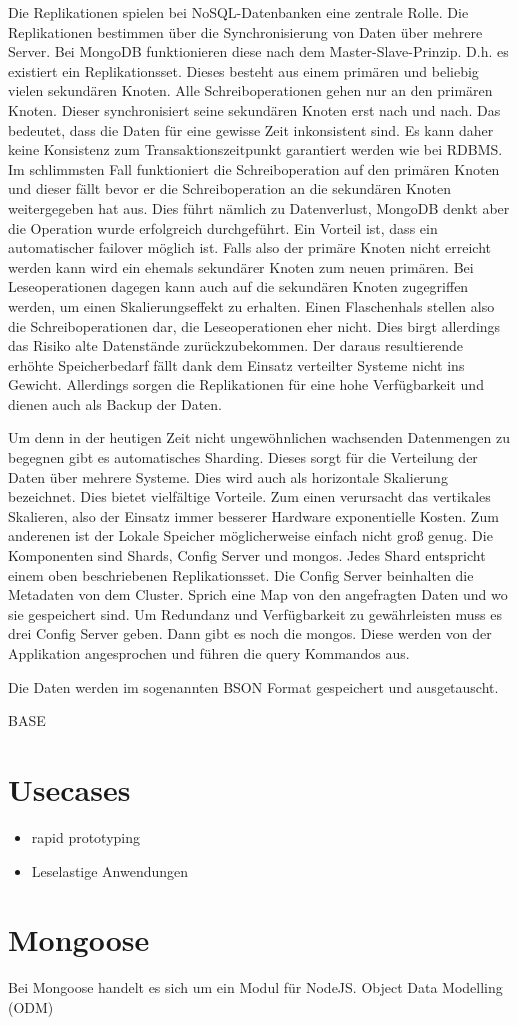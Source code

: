 Die Replikationen spielen bei NoSQL-Datenbanken eine zentrale Rolle. Die
Replikationen bestimmen über die Synchronisierung von Daten über mehrere
Server. Bei MongoDB funktionieren diese nach dem Master-Slave-Prinzip.
D.h. es existiert ein Replikationsset. Dieses besteht aus einem primären
und beliebig vielen sekundären Knoten. Alle Schreiboperationen gehen nur
an den primären Knoten. Dieser synchronisiert seine sekundären Knoten
erst nach und nach. Das bedeutet, dass die Daten für eine gewisse Zeit
inkonsistent sind. Es kann daher keine Konsistenz zum
Transaktionszeitpunkt garantiert werden wie bei RDBMS. Im schlimmsten
Fall funktioniert die Schreiboperation auf den primären Knoten und
dieser fällt bevor er die Schreiboperation an die sekundären Knoten
weitergegeben hat aus. Dies führt nämlich zu Datenverlust, MongoDB denkt
aber die Operation wurde erfolgreich durchgeführt. Ein Vorteil ist, dass
ein automatischer failover möglich ist. Falls also der primäre Knoten
nicht erreicht werden kann wird ein ehemals sekundärer Knoten zum neuen
primären. Bei Leseoperationen dagegen kann auch auf die sekundären
Knoten zugegriffen werden, um einen Skalierungseffekt zu erhalten. Einen
Flaschenhals stellen also die Schreiboperationen dar, die
Leseoperationen eher nicht. Dies birgt allerdings das Risiko alte
Datenstände zurückzubekommen. Der daraus resultierende erhöhte
Speicherbedarf fällt dank dem Einsatz verteilter Systeme nicht ins
Gewicht. Allerdings sorgen die Replikationen für eine hohe Verfügbarkeit
und dienen auch als Backup der Daten.

Um denn in der heutigen Zeit nicht ungewöhnlichen wachsenden Datenmengen
zu begegnen gibt es automatisches Sharding. Dieses sorgt für die
Verteilung der Daten über mehrere Systeme. Dies wird auch als
horizontale Skalierung bezeichnet. Dies bietet vielfältige Vorteile. Zum
einen verursacht das vertikales Skalieren, also der Einsatz immer
besserer Hardware exponentielle Kosten. Zum anderenen ist der Lokale
Speicher möglicherweise einfach nicht groß genug. Die Komponenten sind
Shards, Config Server und mongos. Jedes Shard entspricht einem oben
beschriebenen Replikationsset. Die Config Server beinhalten die
Metadaten von dem Cluster. Sprich eine Map von den angefragten Daten und
wo sie gespeichert sind. Um Redundanz und Verfügbarkeit zu gewährleisten
muss es drei Config Server geben. Dann gibt es noch die mongos. Diese
werden von der Applikation angesprochen und führen die query Kommandos
aus.

Die Daten werden im sogenannten BSON Format gespeichert und
ausgetauscht.

BASE

\section{Usecases}\label{usecases}

\begin{itemize}
\itemsep1pt\parskip0pt
\item
  rapid prototyping
\item
  Leselastige Anwendungen
\end{itemize}

\section{Mongoose}\label{mongoose}

Bei Mongoose handelt es sich um ein Modul für NodeJS. Object Data
Modelling (ODM)

